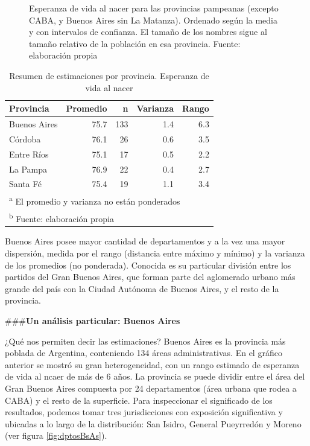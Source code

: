 \documentclass[12pt,]{article}
\begin{document}
\begin{figure}
{}

\caption{Esperanza de vida al nacer para las provincias pampeanas (excepto CABA, y Buenos Aires sin La Matanza). Ordenado según la media y con intervalos de confianza. El tamaño de los nombres sigue al tamaño relativo de la población en esa provincia. Fuente: elaboración propia}\label{fig:jerarq}
\end{figure}

\begin{table}

\caption{\label{tab:dispersion}Resumen de estimaciones por provincia. Esperanza de vida al nacer}
\centering
\begin{tabular}[t]{l|r|r|r|r}
\hline
Provincia & Promedio & n & Varianza & Rango\\
\hline
Buenos Aires & 75.7 & 133 & 1.4 & 6.3\\
\hline
Córdoba & 76.1 & 26 & 0.6 & 3.5\\
\hline
Entre Ríos & 75.1 & 17 & 0.5 & 2.2\\
\hline
La Pampa & 76.9 & 22 & 0.4 & 2.7\\
\hline
Santa Fé & 75.4 & 19 & 1.1 & 3.4\\
\hline
\multicolumn{5}{l}{\textsuperscript{a} El promedio y varianza no están ponderados}\\
\multicolumn{5}{l}{\textsuperscript{b} Fuente: elaboración propia}\\
\end{tabular}
\end{table}

Buenos Aires posee mayor cantidad de departamentos y a la vez una mayor
dispersión, medida por el rango (distancia entre máximo y mínimo) y la
varianza de los promedios (no ponderada). Conocida es su particular
división entre los partidos del Gran Buenos Aires, que forman parte del
aglomerado urbano más grande del país con la Ciudad Autónoma de Buenos
Aires, y el resto de la provincia.

\#\#\#\textbf{Un análisis particular: Buenos Aires}

¿Qué nos permiten decir las estimaciones? Buenos Aires es la provincia
más poblada de Argentina, conteniendo 134 áreas administrativas. En el
gráfico anterior se mostró su gran heterogeneidad, con un rango estimado
de esperanza de vida al ncaer de más de 6 años. La provincia se puede
dividir entre el área del Gran Buenos Aires compuesta por 24
departamentos (área urbana que rodea a CABA) y el resto de la
superficie. Para inspeccionar el significado de los resultados, podemos
tomar tres jurisdicciones con exposición significativa y ubicadas a lo
largo de la distribución: San Isidro, General Pueyrredón y Moreno (ver
figura \ref{fig:dptosBsAs}).
\end{document}
